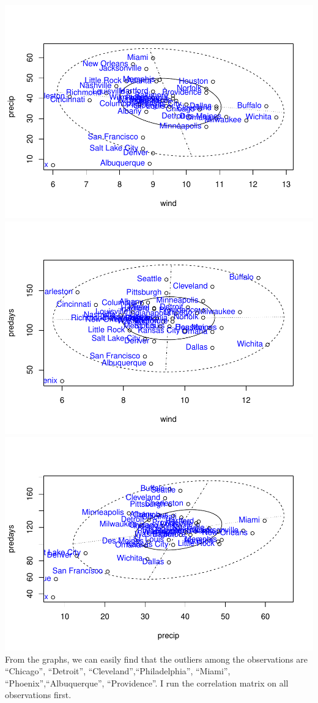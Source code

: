 \documentclass[
]{article}
\begin{document}
\includegraphics[width=0.33\linewidth,height=0.25\textheight]{HUDM6122-Homework_02-Chenguang-Pan_files/figure-latex/unnamed-chunk-1-19}
\includegraphics[width=0.33\linewidth,height=0.25\textheight]{HUDM6122-Homework_02-Chenguang-Pan_files/figure-latex/unnamed-chunk-1-20}
\includegraphics[width=0.33\linewidth,height=0.25\textheight]{HUDM6122-Homework_02-Chenguang-Pan_files/figure-latex/unnamed-chunk-1-21}
From the graphs, we can easily find that the outliers among the
observations are ``Chicago'', ``Detroit'',
``Cleveland'',``Philadelphia'', ``Miami'', ``Phoenix'',``Albuquerque'',
``Providence''. I run the correlation matrix on all observations first.
\end{document}

